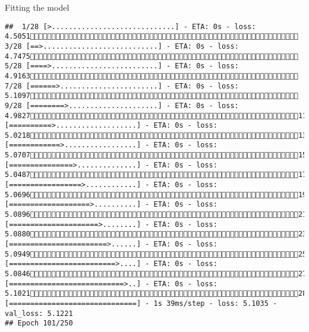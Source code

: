 \documentclass[
  ignorenonframetext,
]{beamer}
\begin{document}
\begin{frame}[fragile]{Fitting the model}
\begin{verbatim}
##  1/28 [>.............................] - ETA: 0s - loss: 4.5051 3/28 [==>...........................] - ETA: 0s - loss: 4.7475 5/28 [====>.........................] - ETA: 0s - loss: 4.9163 7/28 [======>.......................] - ETA: 0s - loss: 5.1097 9/28 [========>.....................] - ETA: 0s - loss: 4.982711/28 [==========>...................] - ETA: 0s - loss: 5.021813/28 [============>.................] - ETA: 0s - loss: 5.070715/28 [===============>..............] - ETA: 0s - loss: 5.048717/28 [=================>............] - ETA: 0s - loss: 5.069619/28 [===================>..........] - ETA: 0s - loss: 5.089621/28 [=====================>........] - ETA: 0s - loss: 5.088023/28 [=======================>......] - ETA: 0s - loss: 5.094925/28 [=========================>....] - ETA: 0s - loss: 5.084627/28 [===========================>..] - ETA: 0s - loss: 5.102128/28 [==============================] - 1s 39ms/step - loss: 5.1035 - val_loss: 5.1221
## Epoch 101/250

\end{verbatim}
\end{frame}
\end{document}
